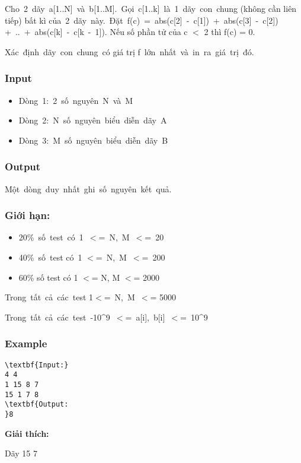 

Cho 2 dãy a[1..N] và b[1..M]. Gọi c[1..k] là 1 dãy con chung (không cần liên tiếp) bất kì của 2 dãy này. Đặt f(c) = abs(c[2] - c[1]) + abs(c[3] - c[2]) + .. + abs(c[k] - c[k - 1]). Nếu số phần tử của c $<$ 2 thì f(c) = 0.

Xác định dãy con chung có giá trị f lớn nhất và in ra giá trị đó.

\subsubsection{Input}
\begin{itemize}
	\item Dòng 1: 2 số nguyên N và M
	\item Dòng 2: N số nguyên biểu diễn dãy A
	\item Dòng 3: M số nguyên biểu diễn dãy B
\end{itemize}

\subsubsection{Output}

Một dòng duy nhất ghi số nguyên kết quả.

\subsubsection{Giới hạn:}
\begin{itemize}
	\item 20\% số test có 1 $<$= N, M $<$= 20
	\item 40\% số test có 1 $<$= N, M $<$= 200
	\item 60\% số test có 1 $<$= N, M $<$= 2000
\end{itemize}

Trong tất cả các test 1$<$= N, M $<$= 5000

Trong tất cả các test -10\textasciicircum9 $<$= a[i], b[i] $<$= 10\textasciicircum9

\subsubsection{Example}
\begin{verbatim}
\textbf{Input:} 
4 4
1 15 8 7
15 1 7 8 
\textbf{Output:
}8\end{verbatim}

\textbf{Giải thích:}

Dãy 15 7